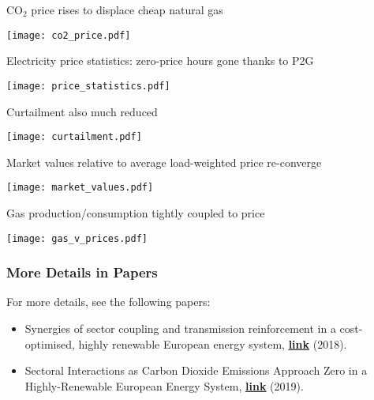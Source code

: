 \documentclass[10pt,aspectratio=169,dvipsnames]{beamer}
\let\olditem\item
\renewcommand{\item}{%
\olditem\vspace{5pt}}
\begin{document}
\begin{frame}{CO$_2$ price rises to displace cheap natural gas}

  \centering
    \texttt{[image: co2\_price.pdf]}

\end{frame}


\begin{frame}{Electricity price statistics: zero-price hours gone thanks to P2G}

  \centering
    \texttt{[image: price\_statistics.pdf]}

\end{frame}



\begin{frame}{Curtailment also much reduced}

  \centering
    \texttt{[image: curtailment.pdf]}

\end{frame}



\begin{frame}{Market values relative to average load-weighted price re-converge}

  \centering
    \texttt{[image: market\_values.pdf]}

\end{frame}




\begin{frame}{Gas production/consumption tightly coupled to price}

  \centering
    \texttt{[image: gas\_v\_prices.pdf]}

\end{frame}


\begin{frame}
  \frametitle{More Details in Papers}

  For more details, see the following papers:
  \begin{itemize}
  \item   Synergies of sector coupling and transmission reinforcement in a cost-optimised, highly renewable European energy system, \href{https://arxiv.org/abs/1801.05290}{\bf\color{blue}\underline{link}} (2018).
    \item Sectoral Interactions as Carbon Dioxide Emissions Approach Zero in a Highly-Renewable European Energy System, \href{https://doi.org/10.3390/en12061032}{\bf\color{blue}\underline{link}} (2019).
  \end{itemize}


\end{frame}
\end{document}
